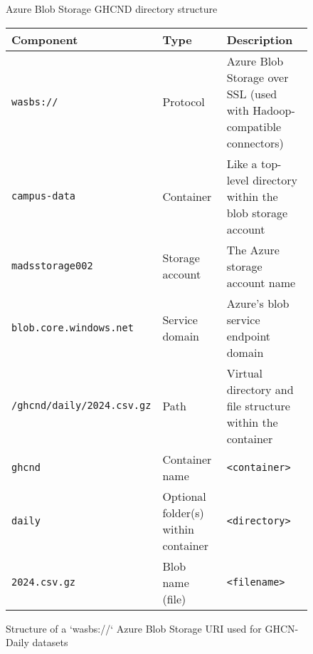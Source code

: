 \documentclass[11pt]{article}
\begin{document}
\begin{figure}[H]
    \centering
\caption{Azure Blob Storage GHCND directory structure }
\label{fig-ghcnd-tree}
\end{figure}
\begin{figure}[htbp]
    \centering
    \begin{minipage}{0.7\textwidth}
    \centering
\begin{tabular}{@{}L{0.42\textwidth} L{0.12\textwidth} L{0.43\textwidth}@{}}
\toprule
\textbf{Component} & \textbf{Type} & \textbf{Description} \\
\midrule
\texttt{wasbs://} & Protocol & Azure Blob Storage over SSL (used with Hadoop-compatible connectors)\par \\
\texttt{campus-data} & Container & Like a top-level directory within the blob storage account\par \\
\texttt{madsstorage002} & Storage account\par & The Azure storage account name \\
\texttt{blob.core.windows.net} & Service domain\par & Azure’s blob service endpoint domain \\
\texttt{/ghcnd/daily/2024.csv.gz} & Path & Virtual directory and file structure within the container\par \\
\texttt{ghcnd} & Container name\par & \texttt{<container>} \\
\texttt{daily} & Optional folder(s) within container\par & \texttt{<directory>}\\
\texttt{2024.csv.gz} & Blob name (file) &  \texttt{<filename>} \\
\bottomrule
\end{tabular}
\caption{Structure of a `wasbs://` Azure Blob Storage URI used for GHCN-Daily datasets}
\label{fig-azure-url}
\end{minipage}
\end{figure}
\bigskip
\end{document}
